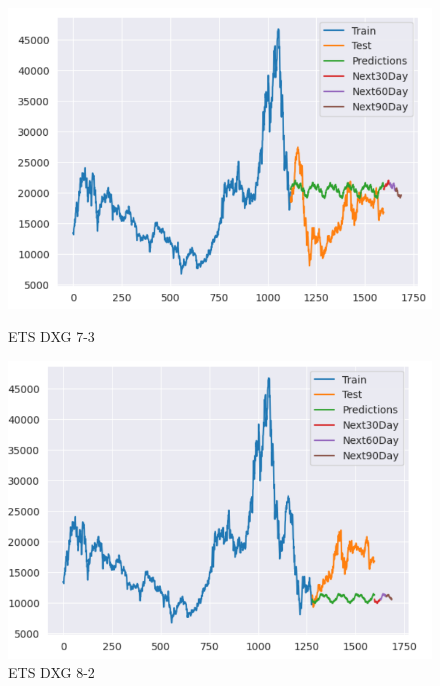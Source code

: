 \documentclass[conference]{IEEEtran}
\begin{document}
\begin{figure}[htbp]
    \begin{minipage}{0.23\textwidth}
    \centering
    \includegraphics[width=1\textwidth]{experiment/ets/TEAM4_ETS_DXG_7_3.png}
    \caption{ETS DXG 7-3}
    \label{fig:nvl_boxplot}
    \end{minipage}
    \hfill
    \begin{minipage}{0.23\textwidth}
    \centering
    \includegraphics[width=1\textwidth]{experiment/ets/TEAM4_ETS_DXG_8_2.png}
    \caption{ETS DXG 8-2}
    \label{fig:nvl_histogram}
    \end{minipage}
    \begin{minipage}{0.23\textwidth}
    \centering

\end{minipage}
\end{figure}
\end{document}
